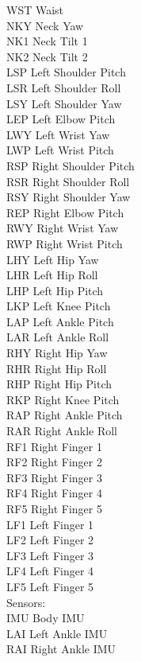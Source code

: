 \documentclass[12pt]{article}
\begin{document}
\noindent WST		Waist\\
NKY		Neck Yaw\\
NK1		Neck Tilt 1\\
NK2		Neck Tilt 2\\
LSP		Left Shoulder Pitch\\
LSR		Left Shoulder Roll\\
LSY		Left Shoulder Yaw\\
LEP		Left Elbow Pitch\\
LWY		Left Wrist Yaw\\
LWP		Left Wrist Pitch\\
RSP		Right Shoulder Pitch\\
RSR		Right Shoulder Roll\\
RSY		Right Shoulder Yaw\\
REP		Right Elbow Pitch\\
RWY		Right Wrist Yaw\\
RWP		Right Wrist Pitch\\
LHY		Left Hip Yaw\\
LHR		Left Hip Roll\\
LHP		Left Hip Pitch\\
LKP		Left Knee Pitch\\
LAP		Left Ankle Pitch\\
LAR		Left Ankle Roll\\
RHY		Right Hip Yaw\\
RHR		Right Hip Roll\\
RHP		Right Hip Pitch\\
RKP		Right Knee Pitch\\
RAP		Right Ankle Pitch\\
RAR		Right Ankle Roll\\
RF1		Right Finger 1\\
RF2		Right Finger 2\\
RF3		Right Finger 3\\
RF4		Right Finger 4\\
RF5		Right Finger 5\\
LF1		Left Finger 1\\
LF2		Left Finger 2\\
LF3		Left Finger 3\\
LF4		Left Finger 4\\
LF5		Left Finger 5\\

\noindent Sensors:\\

\noindent IMU		Body IMU\\
LAI		Left Ankle IMU\\
RAI		Right Ankle IMU\\
\end{document}
